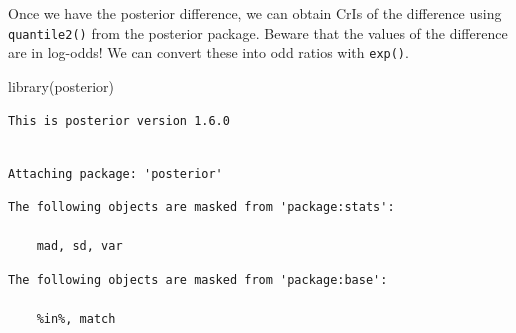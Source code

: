 \documentclass[
  authoryear,
  preprint,
  3p]{elsarticle}
\newenvironment{Shaded}{\begin{snugshade}}{\end{snugshade}}
\newcommand{\FunctionTok}[1]{\textcolor[rgb]{0.28,0.35,0.67}{#1}}
\newcommand{\NormalTok}[1]{\textcolor[rgb]{0.00,0.23,0.31}{#1}}
\begin{document}
\begin{figure}[H]


\caption{\label{fig-diff-p-tk}}

\end{figure}%

Once we have the posterior difference, we can obtain CrIs of the
difference using \texttt{quantile2()} from the posterior package. Beware
that the values of the difference are in log-odds! We can convert these
into odd ratios with \texttt{exp()}.

\begin{Shaded}
\begin{Highlighting}[]
\FunctionTok{library}\NormalTok{(posterior)}
\end{Highlighting}
\end{Shaded}

\begin{verbatim}
This is posterior version 1.6.0
\end{verbatim}

\begin{verbatim}

Attaching package: 'posterior'
\end{verbatim}

\begin{verbatim}
The following objects are masked from 'package:stats':

    mad, sd, var
\end{verbatim}

\begin{verbatim}
The following objects are masked from 'package:base':

    %in%, match
\end{verbatim}
\end{document}
